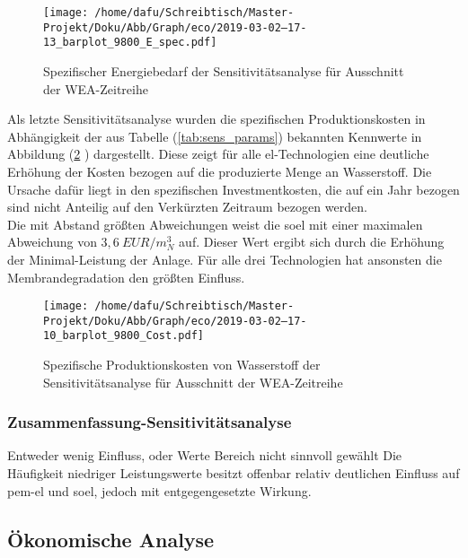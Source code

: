 \documentclass[onecolumn,10pt,titlepage]{article}
\begin{document}
\begin{figure}[H]
	\centering
	\texttt{[image: /home/dafu/Schreibtisch/Master-Projekt/Doku/Abb/Graph/eco/2019-03-02--17-13\_barplot\_9800\_E\_spec.pdf]}
	\caption[Spezifischer Energiebedarf; Sensitivitätsanalyse]{Spezifischer Energiebedarf der Sensitivitätsanalyse für Ausschnitt der WEA-Zeitreihe}
	\label{fig:barplot_eco_9800_Espec}
\end{figure}
Als letzte Sensitivitätsanalyse wurden die spezifischen Produktionskosten in Abhängigkeit der aus Tabelle (\ref{tab:sens_params}) bekannten Kennwerte in Abbildung (\ref{fig:barplot_eco_9800_Cost} ) dargestellt. Diese zeigt für alle \gls{el}-Technologien eine deutliche Erhöhung der Kosten bezogen auf die produzierte Menge an Wasserstoff. Die Ursache dafür liegt in den spezifischen Investmentkosten, die auf ein Jahr bezogen sind nicht Anteilig auf den Verkürzten Zeitraum bezogen werden.\\
Die mit Abstand größten Abweichungen weist die \gls{soel} mit einer maximalen Abweichung von $3,6~EUR/m^3_N$ auf. Dieser Wert ergibt sich durch die Erhöhung der Minimal-Leistung der Anlage. Für alle drei Technologien hat ansonsten die Membrandegradation den größten Einfluss.

\begin{figure}[H]
	\centering
	\texttt{[image: /home/dafu/Schreibtisch/Master-Projekt/Doku/Abb/Graph/eco/2019-03-02--17-10\_barplot\_9800\_Cost.pdf]}
	\caption[Spezifische Produktionskosten; Sensitivitätsanalyse]{Spezifische Produktionskosten von Wasserstoff der Sensitivitätsanalyse für Ausschnitt der WEA-Zeitreihe}
	\label{fig:barplot_eco_9800_Cost} 
\end{figure}
\subsubsection{Zusammenfassung-Sensitivitätsanalyse}
Entweder wenig Einfluss, oder Werte Bereich nicht sinnvoll gewählt
Die Häufigkeit niedriger Leistungswerte besitzt offenbar relativ deutlichen Einfluss auf \gls{pem}-\gls{el} und \gls{soel}, jedoch mit entgegengesetzte Wirkung.

\subsection{Ökonomische Analyse}
\end{document}
